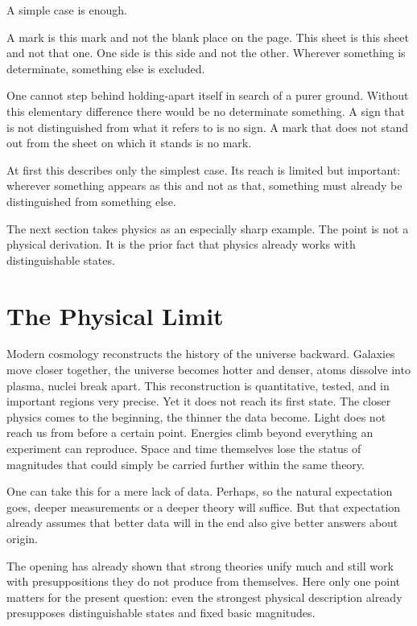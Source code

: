 \documentclass[11pt,a4paper]{book}
\begin{document}
A simple case is enough.

A mark is this mark and not the blank place on the page. This sheet is this
sheet and not that one. One side is this side and not the other. Wherever
something is determinate, something else is excluded.

One cannot step behind holding-apart itself in search of a purer ground.
Without this elementary difference there would be no determinate something.
A sign that is not distinguished from what it refers to is no sign. A mark
that does not stand out from the sheet on which it stands is no mark.

At first this describes only the simplest case. Its reach is limited but
important: wherever something appears as this and not as that, something
must already be distinguished from something else.

The next section takes physics as an especially sharp example. The point is
not a physical derivation. It is the prior fact that physics already works
with distinguishable states.

\section{The Physical Limit}
\label{ch:edge}

Modern cosmology reconstructs the history of the universe backward.
Galaxies move closer together, the universe becomes hotter and denser,
atoms dissolve into plasma, nuclei break apart. This reconstruction is
quantitative, tested, and in important regions very precise. Yet it does
not reach its first state. The closer physics comes to the beginning, the
thinner the data become. Light does not reach us from before a certain
point. Energies climb beyond everything an experiment can reproduce. Space
and time themselves lose the status of magnitudes that could simply be
carried further within the same theory.

One can take this for a mere lack of data. Perhaps, so the natural
expectation goes, deeper measurements or a deeper theory will suffice. But
that expectation already assumes that better data will in the end also give
better answers about origin.

The opening has already shown that strong theories unify much and still work
with presuppositions they do not produce from themselves. Here only one
point matters for the present question: even the strongest physical
description already presupposes distinguishable states and fixed basic
magnitudes.
\end{document}
